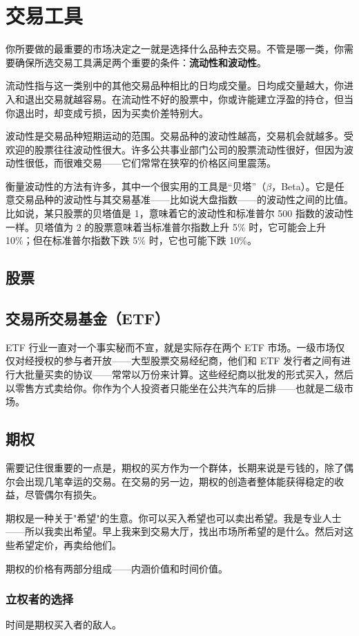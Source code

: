 \chapter{交易工具}
你所要做的最重要的市场决定之一就是选择什么品种去交易。不管是哪一类，你需要确保所选交易工具满足两个重要的条件：\textbf{流动性和波动性}。

流动性指与这一类别中的其他交易品种相比的日均成交量。日均成交量越大，你进入和退出交易就越容易。在流动性不好的股票中，你或许能建立浮盈的持仓，但当你退出时，却变成亏损，因为买卖价差特别大。

波动性是交易品种短期运动的范围。交易品种的波动性越高，交易机会就越多。受欢迎的股票往往波动性很大。许多公共事业部门公司的股票流动性很好，但因为波动性很低，而很难交易——它们常常在狭窄的价格区间里震荡。

衡量波动性的方法有许多，其中一个很实用的工具是“贝塔”（$\beta$，Beta）。它是任意交易品种的波动性与其交易基准——比如说大盘指数——的波动性之间的比值。比如说，某只股票的贝塔值是 1，意味着它的波动性和标准普尔 500 指数的波动性一样。贝塔值为 2 的股票意味着当标准普尔指数上升 5\% 时，它可能会上升 10\%；但在标准普尔指数下跌 5\% 时，它也可能下跌 10\%。
\section{股票}
\section{交易所交易基金（ETF）}
ETF 行业一直对一个事实秘而不宣，就是实际存在两个 ETF 市场。一级市场仅仅对经授权的参与者开放——大型股票交易经纪商，他们和 ETF 发行者之间有进行大批量买卖的协议——常常以万份来计算。这些经纪商以批发的形式买入，然后以零售方式卖给你。你作为个人投资者只能坐在公共汽车的后排——也就是二级市场。
\section{期权}
需要记住很重要的一点是，期权的买方作为一个群体，长期来说是亏钱的，除了偶尔会出现几笔幸运的交易。在交易的另一边，期权的创造者整体能获得稳定的收益，尽管偶尔有损失。

期权是一种关于"希望"的生意。你可以买入希望也可以卖出希望。我是专业人士——所以我卖出希望。早上我来到交易大厅，找出市场所希望的是什么。然后对这些希望定价，再卖给他们。

期权的价格有两部分组成——内涵价值和时间价值。
\subsection*{立权者的选择}
时间是期权买入者的敌人。

